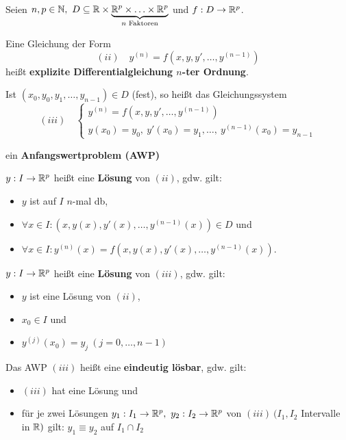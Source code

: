 \documentclass{article}
\begin{document}
\begin{definition}
Seien $n,p \in\MdN,\ D\subseteq\MdR\times\underbrace{\MdR^p\times\ldots\times\MdR^p}_{n\text{ Faktoren}}$ und $f:D\to\mathbb{R}^p$.

Eine Gleichung der Form $$(ii)\quad y^{(n)} = f(x,y,y',\ldots,y^{(n-1)})$$ heißt \textbf{explizite Differentialgleichung $n$-ter Ordnung}.


Ist $(x_0,y_0,y_1,\ldots,y_{n-1})\in D$ (fest), so heißt das Gleichungssystem
$$(iii)\quad\begin{cases}y^{(n)} = f(x,y,y',\ldots,y^{(n-1)})\\ y(x_0)=y_0,\ y'(x_0)=y_1,\ldots,\ y^{(n-1)}(x_0)=y_{n-1}\end{cases}$$

ein \textbf{Anfangswertproblem (AWP)}


$y:I\to\mathbb{R}^p$ heißt eine \textbf{Lösung} von $(ii)$, gdw. gilt:
\begin{itemize}
\item $y$ ist auf $I$ $n$-mal db,
\item $\forall x\in I: (x,y(x),y'(x),\ldots,y^{(n-1)}(x))\in D$ und
\item $\forall x\in I: y^{(n)}(x) = f(x,y(x),y'(x),\ldots,y^{(n-1)}(x)).$
\end{itemize}


$y:I\to\mathbb{R}^p$ heißt eine \textbf{Lösung} von $(iii)$, gdw. gilt:
\begin{itemize}
\item $y$ ist eine Lösung von $(ii)$,
\item $x_0 \in I$ und
\item $y^{(j)}(x_0) = y_j\ (j=0,\ldots,n-1)$
\end{itemize}

Das AWP $(iii)$ heißt eine \textbf{eindeutig lösbar}, gdw. gilt:
\begin{itemize}
\item $(iii)$ hat eine Lösung und
\item für je zwei Lösungen $y_1:I_1\to\mathbb{R}^p,\ y_2:I_2\to\mathbb{R}^p$ von $(iii)\ (I_1,I_2$ Intervalle in $\mathbb{R})$ gilt: $y_1\equiv y_2$ auf $I_1 \cap I_2$
\end{itemize}
\end{definition}
\end{document}
